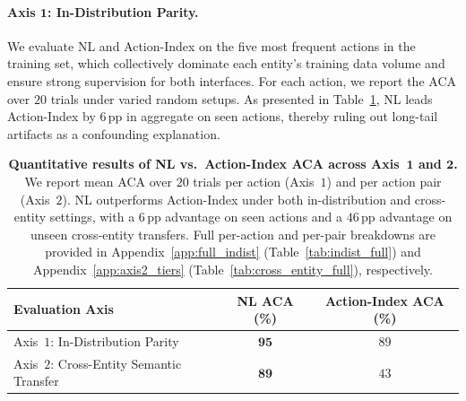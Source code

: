 
\paragraph{Axis $\mathbf{1}$: In-Distribution Parity. }
We evaluate NL and Action-Index on the five most frequent actions in the training set,
which collectively dominate each entity's training data volume and ensure
strong supervision for both interfaces.
For each action, we report the ACA over $20$ trials under varied random setups. 
As presented in Table~\ref{tab:main_results},
NL leads Action-Index by $6$\,pp in aggregate on seen actions, thereby ruling out long-tail artifacts as a confounding explanation.

\begin{table}[t]
  \caption{\textbf{Quantitative results of NL vs.\ Action-Index ACA across Axis~$\mathbf{1}$ and $\mathbf{2}$.}
    We report mean ACA over $20$ trials per action (Axis~$1$) and per action pair (Axis~$2$).
    NL outperforms Action-Index under both in-distribution and cross-entity settings,
    with a $6$\,pp advantage on seen actions and a $46$\,pp advantage on unseen cross-entity transfers.
    Full per-action and per-pair breakdowns are provided in
    Appendix~\ref{app:full_indist} (Table~\ref{tab:indist_full}) and
    Appendix~\ref{app:axis2_tiers} (Table~\ref{tab:cross_entity_full}), respectively.}
  \label{tab:main_results}
  \centering
  \setlength{\tabcolsep}{5pt}
  \begin{tabular}{p{6cm}cc}
    \toprule
    Evaluation Axis & \textbf{NL ACA (\%)} & Action-Index ACA (\%) \\
    \midrule
    Axis~$1$: In-Distribution Parity      & $\mathbf{95}$ & $89$ \\
    Axis~$2$: Cross-Entity Semantic Transfer & $\mathbf{89}$ & $43$ \\
    \bottomrule
  \end{tabular}
\end{table}

